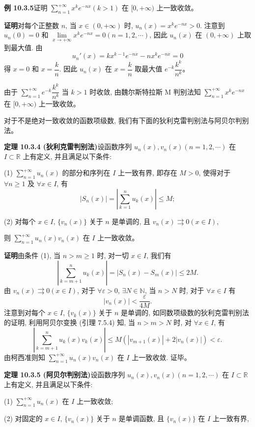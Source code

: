 \documentclass[UTF8, 12pt, fontset=fandol, oneside]{ctexart}
\begin{document}
\noindent\textbf{例 10.3.5}\quad 证明 $\sum\limits_{n=1}^{+\infty}x^ke^{-nx}(k>1)$ 在 $[0,+\infty)$ 上一致收敛。

\noindent\textbf{证明}\quad 对每个正整数 $n$, 当 $x\in(0,+\infty)$ 时, $u_n(x)=x^ke^{-nx}>0$. 注意到 $u_n(0)=0$ 和 $\lim\limits_{x\to+\infty}x^ke^{-nx}=0(n=1,2,\cdots)$, 因此 $u_n(x)$ 在 $(0,+\infty)$ 上取到最大值. 由
\[
  u_n'(x)=kx^{k-1}e^{-nx}-nx^ke^{-nx}=0
\]
得 $x=0$ 和 $x=\dfrac{k}{n}$. 因此 $u_n(x)$ 在 $x=\dfrac{k}{n}$ 取最大值 $e^{-k}\dfrac{k^k}{n^k}$。

由于 $\sum\limits_{n=1}^{+\infty}e^{-k}\dfrac{k^k}{n^k}$ 当 $k>1$ 时收敛, 由魏尔斯特拉斯 M 判别法知 $\sum\limits_{n=1}^{+\infty}x^ke^{-nx}$ 在 $[0,+\infty)$ 上一致收敛。

对于不是绝对一致收敛的函数项级数, 我们有下面的狄利克雷判别法与阿贝尔判别法。

\noindent\textbf{定理 10.3.4 (狄利克雷判别法)}\quad 设函数序列 $u_n(x),v_n(x)(n=1,2,\cdots)$ 在 $I\subset\mathbb R$ 上有定义, 并且满足以下条件:

(1) $\sum\limits_{n=1}^{+\infty}u_n(x)$ 的部分和序列在 $I$ 上一致有界, 即存在 $M>0$, 使得对于 $\forall n\geq1$ 及 $\forall x\in I$, 有
\[
  |S_n(x)|=\left|\sum_{k=1}^n u_k(x)\right|\leq M;
\]

(2) 对每个 $x\in I$, $\{v_n(x)\}$ 关于 $n$ 是单调的, 且 $v_n(x)\rightrightarrows0(x\in I)$,

则 $\sum\limits_{n=1}^{+\infty}u_n(x)v_n(x)$ 在 $I$ 上一致收敛。

\noindent\textbf{证明}\quad 由条件 (1), 当 $n>m\geq1$ 时, 对一切 $x\in I$, 我们有
\[
  \left|\sum_{k=m+1}^n u_k(x)\right|=|S_n(x)-S_m(x)|\leq2M.
\]
由 $v_n(x)\rightrightarrows0(x\in I)$, 对于 $\forall\varepsilon>0$, $\exists N\in\mathbb N$, 当 $n>N$ 时, 对于 $\forall x\in I$ 有
\[
  |v_n(x)|<\frac{\varepsilon}{4M}.
\]
注意到对每个 $x\in I$, $\{v_k(x)\}$ 关于 $n$ 是单调的, 如同数项级数的狄利克雷判别法的证明, 利用阿贝尔变换 (引理 7.5.4) 知, 当 $n>m>N$ 时, 对 $\forall x\in I$, 有
\[
  \left|\sum_{k=m+1}^n u_k(x)v_k(x)\right|
  \leq M(|v_{m+1}(x)|+2|v_n(x)|)<\varepsilon.
\]
由柯西准则知 $\sum\limits_{n=1}^{+\infty}u_n(x)v_n(x)$ 在 $I$ 上一致收敛. 证毕。

\noindent\textbf{定理 10.3.5 (阿贝尔判别法)}\quad 设函数序列 $u_n(x),v_n(x)(n=1,2,\cdots)$ 在 $I\subset\mathbb R$ 上有定义, 并且满足以下条件:

(1) $\sum\limits_{n=1}^{+\infty}u_n(x)$ 在 $I$ 上一致收敛;

(2) 对固定的 $x\in I$, $\{v_n(x)\}$ 关于 $n$ 是单调函数, 且 $\{v_n(x)\}$ 在 $I$ 上一致有界,
\end{document}
